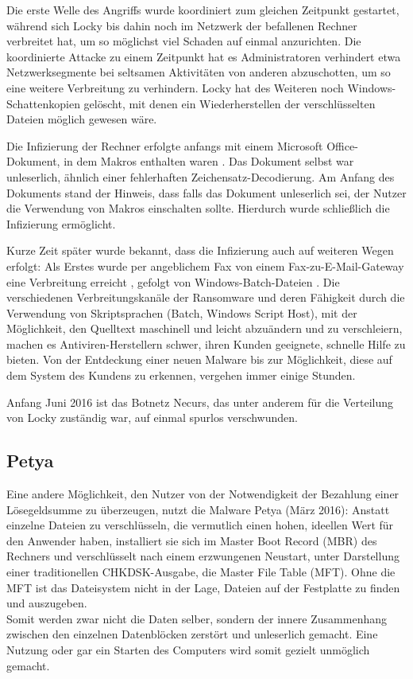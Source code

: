 Die erste Welle des Angriffs wurde koordiniert zum gleichen Zeitpunkt gestartet, während sich Locky bis dahin noch im Netzwerk der befallenen Rechner verbreitet hat, um so möglichst viel Schaden auf einmal anzurichten. Die koordinierte Attacke zu einem Zeitpunkt hat es Administratoren verhindert etwa Netzwerksegmente bei seltsamen Aktivitäten von anderen abzuschotten, um so eine weitere Verbreitung zu verhindern. Locky hat des Weiteren noch Windows-Schattenkopien gelöscht, mit denen ein Wiederherstellen der verschlüsselten Dateien möglich gewesen wäre. \cite{locky:start}

Die Infizierung der Rechner erfolgte anfangs mit einem Microsoft Office-Dokument, in dem Makros enthalten waren \cite{locky:infection}. Das Dokument selbst war unleserlich, ähnlich einer fehlerhaften Zeichensatz-Decodierung. Am Anfang des Dokuments stand der Hinweis, dass falls das Dokument unleserlich sei, der Nutzer die Verwendung von Makros einschalten sollte. Hierdurch wurde schließlich die Infizierung ermöglicht.

Kurze Zeit später wurde bekannt, dass die Infizierung auch auf weiteren Wegen erfolgt: Als Erstes wurde per angeblichem Fax von einem Fax-zu-E-Mail-Gateway eine Verbreitung erreicht \cite{locky:fax}, gefolgt von Windows-Batch-Dateien \cite{locky:batch}. Die verschiedenen Verbreitungskanäle der Ransomware und deren Fähigkeit durch die Verwendung von Skriptsprachen (Batch, Windows Script Host), mit der Möglichkeit, den Quelltext maschinell und leicht abzuändern und zu verschleiern, machen es Antiviren-Herstellern schwer, ihren Kunden geeignete, schnelle Hilfe zu bieten. Von der Entdeckung einer neuen Malware bis zur Möglichkeit, diese auf dem System des Kundens zu erkennen, vergehen immer einige Stunden.

Anfang Juni 2016 ist das Botnetz \glqq Necurs\grqq, das unter anderem für die Verteilung von Locky zuständig war, auf einmal spurlos verschwunden. \cite{locky:end}

		
\subsection{Petya}
Eine andere Möglichkeit, den Nutzer von der Notwendigkeit der Bezahlung einer Lösegeldsumme zu überzeugen, nutzt die Malware \glqq Petya\grqq{} (März 2016): Anstatt einzelne Dateien zu verschlüsseln, die vermutlich einen hohen, ideellen Wert für den Anwender haben, installiert sie sich im Master Boot Record (MBR) des Rechners und verschlüsselt nach einem erzwungenen Neustart, unter Darstellung einer traditionellen CHKDSK-Ausgabe, die Master File Table (MFT). Ohne die MFT ist das Dateisystem nicht in der Lage, Dateien auf der Festplatte zu finden und auszugeben. \cite{petya:start} \\
Somit werden zwar nicht die Daten selber, sondern der innere Zusammenhang zwischen den einzelnen Datenblöcken zerstört und unleserlich gemacht. Eine Nutzung oder gar ein Starten des Computers wird somit gezielt unmöglich gemacht.

